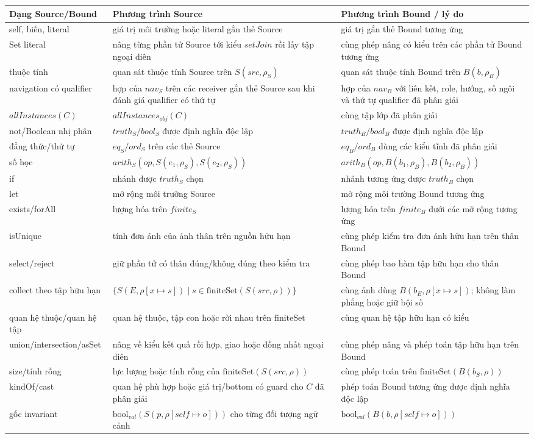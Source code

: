 \documentclass[11pt,a4paper]{article}
\theoremstyle{definition}
\newcommand{\boolval}{\mathrm{bool}_{val}}
\newcommand{\finiteSet}{\mathrm{finiteSet}}
\begin{document}
\begingroup\scriptsize
\begin{longtable}{p{}p{}p{}}
\toprule Dạng Source/Bound & Phương trình Source & Phương trình Bound / lý do\\ \midrule
self, biến, literal & giá trị môi trường hoặc literal gắn thẻ Source & giá trị gắn thẻ Bound tương ứng\\
Set literal & nâng từng phần tử Source tới kiểu $setJoin$ rồi lấy tập ngoại diên & cùng phép nâng có kiểu trên các phần tử Bound tương ứng\\
thuộc tính & quan sát thuộc tính Source trên $S(src,\rho_S)$ & quan sát thuộc tính Bound trên $B(b,\rho_B)$\\
navigation có qualifier & hợp của $nav_S$ trên các receiver gắn thẻ Source sau khi đánh giá qualifier có thứ tự & hợp của $nav_B$ với liên kết, role, hướng, số ngôi và thứ tự qualifier đã phân giải\\
$allInstances(C)$ & $allInstances_{obj}(C)$ & cùng tập lớp đã phân giải\\
not/Boolean nhị phân & $truth_S/bool_S$ được định nghĩa độc lập & $truth_B/bool_B$ được định nghĩa độc lập\\
đẳng thức/thứ tự & $eq_S/ord_S$ trên các thẻ Source & $eq_B/ord_B$ dùng các kiểu tĩnh đã phân giải\\
số học & $arith_S(op,S(e_1,\rho_S),S(e_2,\rho_S))$ & $arith_B(op,B(b_1,\rho_B),B(b_2,\rho_B))$\\
if & nhánh được $truth_S$ chọn & nhánh tương ứng được $truth_B$ chọn\\
let & mở rộng môi trường Source & mở rộng môi trường Bound tương ứng\\
exists/forAll & lượng hóa trên $finite_S$ & lượng hóa trên $finite_B$ dưới các mở rộng tương ứng\\
isUnique & tính đơn ánh của ảnh thân trên nguồn hữu hạn & cùng phép kiểm tra đơn ánh hữu hạn trên thân Bound\\
select/reject & giữ phần tử có thân đúng/không đúng theo kiểm tra & cùng phép bao hàm tập hữu hạn cho thân Bound\\
collect theo tập hữu hạn & $\{S(E,\rho[x\mapsto s])\mid s\in\finiteSet(S(src,\rho))\}$ & cùng ảnh dùng $B(b_E,\rho[x\mapsto s])$; không làm phẳng hoặc giữ bội số\\
quan hệ thuộc/quan hệ tập & quan hệ thuộc, tập con hoặc rời nhau trên $\finiteSet$ & cùng quan hệ tập hữu hạn có kiểu\\
union/intersection/asSet & nâng về kiểu kết quả rồi hợp, giao hoặc đồng nhất ngoại diên & cùng phép nâng và phép toán tập hữu hạn trên Bound\\
size/tính rỗng & lực lượng hoặc tính rỗng của $\finiteSet(S(src,\rho))$ & cùng phép toán trên $\finiteSet(B(b_S,\rho))$\\
kindOf/cast & quan hệ phù hợp hoặc giá trị/bottom có guard cho $C$ đã phân giải & phép toán Bound tương ứng được định nghĩa độc lập\\
gốc invariant & $\boolval(S(p,\rho[self\mapsto o]))$ cho từng đối tượng ngữ cảnh & $\boolval(B(b,\rho[self\mapsto o]))$\\
\bottomrule
\end{longtable}
\endgroup
\end{document}
